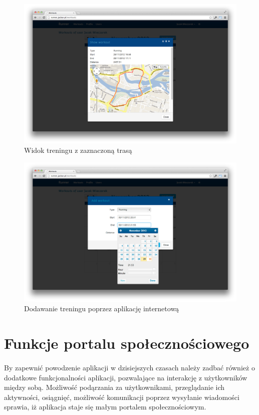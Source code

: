 \begin{figure}[ht]
	\centering
		\includegraphics[width=1\linewidth]{assets/workout_map.png}
	\caption{Widok treningu z zaznaczoną trasą}
	\label{fig:workout_map}
\end{figure}

\begin{figure}[ht]
	\centering
		\includegraphics[width=1\linewidth]{assets/add_workout2.png}
	\caption{Dodawanie treningu poprzez aplikację internetową}
	\label{fig:add_workout}
\end{figure}

\section{Funkcje portalu społecznościowego} %
\label{sec:profil_u_ytkownika}
\paragraph{} %
\label{par:}
By zapewnić powodzenie aplikacji w dzisiejszych czasach należy zadbać również o dodatkowe funkcjonalności aplikacji, pozwalające na interakcję z użytkowników między sobą. Możliwość podąrzania za użytkownikami, przeglądanie ich aktywności, osiągnięć, możliwość komunikacji poprzez wysyłanie wiadomości sprawia, iż aplikacja staje się małym portalem społecznościowym. 
